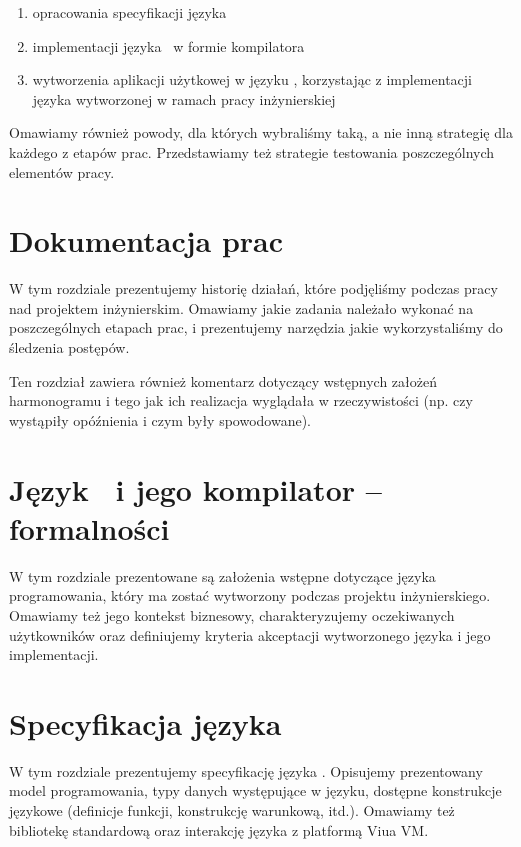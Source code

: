 \documentclass[11pt,oneside,a4paper,titlepage,onecolumn]{book}
\begin{document}
\begin{enumerate}
    \item opracowania specyfikacji języka \ViuAct
    \item implementacji języka \ViuAct\ w formie kompilatora
    \item wytworzenia aplikacji użytkowej w języku \ViuAct, korzystając z implementacji języka wytworzonej w
        ramach pracy inżynierskiej
\end{enumerate}

Omawiamy również powody, dla których wybraliśmy taką, a nie inną strategię dla każdego z etapów prac.
Przedstawiamy też strategie testowania poszczególnych elementów pracy.

\section{Dokumentacja prac}

W tym rozdziale prezentujemy historię działań, które podjęliśmy podczas pracy nad projektem inżynierskim.
Omawiamy jakie zadania należało wykonać na poszczególnych etapach prac, i prezentujemy narzędzia jakie
wykorzystaliśmy do śledzenia postępów.

Ten rozdział zawiera również komentarz dotyczący wstępnych założeń harmonogramu i tego jak ich realizacja
wyglądała w rzeczywistości (np. czy wystąpiły opóźnienia i czym były spowodowane).


\section{Język \ViuAct\ i jego kompilator -- formalności}

W tym rozdziale prezentowane są założenia wstępne dotyczące języka programowania, który ma zostać wytworzony
podczas projektu inżynierskiego. Omawiamy też jego kontekst biznesowy, charakteryzujemy oczekiwanych
użytkowników oraz definiujemy kryteria akceptacji wytworzonego języka i jego implementacji.

\section{Specyfikacja języka \ViuAct}

W tym rozdziale prezentujemy specyfikację języka \ViuAct. Opisujemy prezentowany model programowania, typy
danych występujące w języku, dostępne konstrukcje językowe (definicje funkcji, konstrukcję warunkową,
itd.). Omawiamy też bibliotekę standardową oraz interakcję języka z platformą Viua VM.
\end{document}
